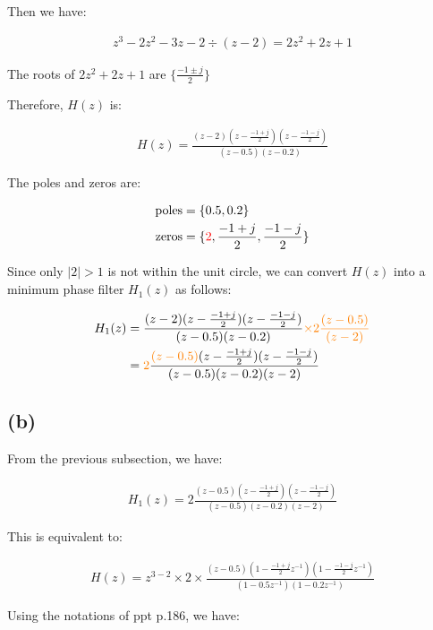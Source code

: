 \documentclass{article}
\begin{document}
Then we have:

\begin{align*}
    z^3 - 2z^2 -3z - 2 \div (z - 2) = 2z^2 + 2z + 1
\end{align*}

The roots of $2z^2 + 2z + 1$ are $\{\frac{-1 \pm j}{2}\}$

Therefore, $H(z)$ is:

\begin{align*}
    H(z) = \frac{(z - 2)(z - \frac{-1 + j}{2})(z - \frac{-1 - j}{2})}{(z - 0.5)(z - 0.2)} 
\end{align*}

The poles and zeros are:

\begin{align*}
    \text{poles} &= \{0.5, 0.2\} \\
    \text{zeros} &= \{\textcolor{red}{2}, \frac{-1 + j}{2}, \frac{-1 - j}{2}\}
\end{align*}

Since only $|2| > 1$ is not within the unit circle, 
we can convert $H(z)$ into a minimum phase filter $H_1(z)$ as follows:

\begin{align*}
    H_1(z) 
    &= \frac{(z - 2)(z - \frac{-1 + j}{2})(z - \frac{-1 - j}{2})}{(z - 0.5)(z - 0.2)} \textcolor{orange}{\times 2 \frac{(z - 0.5)}{(z - 2)}} \\
    &= \textcolor{orange}{2} \frac{\textcolor{orange}{(z - 0.5)}(z - \frac{-1 + j}{2})(z - \frac{-1 - j}{2})}{(z - 0.5)(z - 0.2)(z - 2)}
\end{align*}

\subsection*{(b)}

From the previous subsection, we have:

\begin{align*}
    H_1(z) = 2 \frac{(z - 0.5)(z - \frac{-1 + j}{2})(z - \frac{-1 - j}{2})}{(z - 0.5)(z - 0.2)(z - 2)}
\end{align*}

This is equivalent to:

\begin{align*}
    H(z) = z^{3 - 2} \times 2 \times \frac{(z - 0.5)(1 - \frac{-1 + j}{2}z^{-1})(1 - \frac{-1 - j}{2}z^{-1})}{(1 - 0.5z^{-1})(1 - 0.2z^{-1})} 
\end{align*}

Using the notations of ppt p.186, we have:
\end{document}
